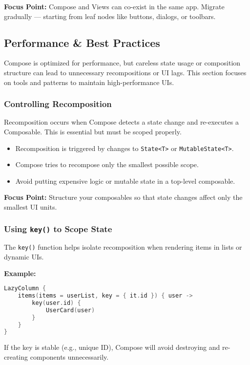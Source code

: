 \documentclass[a4paper,12pt]{article}
\begin{document}
\textbf{Focus Point:} Compose and Views can co-exist in the same app. Migrate gradually — starting from leaf nodes like buttons, dialogs, or toolbars.

\subsection{Performance \& Best Practices}

Compose is optimized for performance, but careless state usage or composition structure can lead to unnecessary recompositions or UI lags. This section focuses on tools and patterns to maintain high-performance UIs.

\subsubsection{Controlling Recomposition}

Recomposition occurs when Compose detects a state change and re-executes a Composable. This is essential but must be scoped properly.

\begin{itemize}
  \item Recomposition is triggered by changes to \texttt{State<T>} or \texttt{MutableState<T>}.
  \item Compose tries to recompose only the smallest possible scope.
  \item Avoid putting expensive logic or mutable state in a top-level composable.
\end{itemize}

\textbf{Focus Point:} Structure your composables so that state changes affect only the smallest UI units.

\subsubsection{Using \texttt{key()} to Scope State}

The \texttt{key()} function helps isolate recomposition when rendering items in lists or dynamic UIs.

\textbf{Example:}
\begin{lstlisting}[language=Kotlin]
LazyColumn {
    items(items = userList, key = { it.id }) { user ->
        key(user.id) {
            UserCard(user)
        }
    }
}
\end{lstlisting}

If the key is stable (e.g., unique ID), Compose will avoid destroying and re-creating components unnecessarily.
\end{document}
